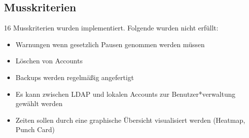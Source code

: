 \begin{frame}
	\subsection{Musskriterien}
	16 Musskriterien wurden implementiert. Folgende wurden nicht erfüllt:
	\begin{itemize}
		\item Warnungen wenn gesetzlich Pausen genommen werden müssen
		\item Löschen von Accounts
		\item Backups werden regelmäßig angefertigt
		\item Es kann zwischen LDAP und lokalen Accounts zur Benutzer*verwaltung gewählt werden
		\item Zeiten sollen durch eine graphische Übersicht visualisiert werden (Heatmap, Punch Card)
	\end{itemize}
\end{frame}

